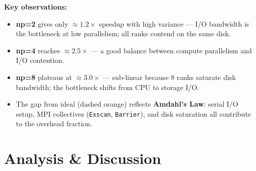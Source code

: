 \documentclass[11pt,a4paper]{article}
\begin{document}
\vspace{0.3cm}

\begin{tcolorbox}[colback=lightgray,colframe=primary,boxrule=0.8pt]
\small
\textbf{Key observations:}
\begin{itemize}[nosep,leftmargin=*]
  \item \textbf{np=2} gives only $\approx1.2\times$ speedup with high variance — I/O bandwidth is the bottleneck at low parallelism; all ranks contend on the same disk.
  \item \textbf{np=4} reaches $\approx2.5\times$ — a good balance between compute parallelism and I/O contention.
  \item \textbf{np=8} plateaus at $\approx3.0\times$ — sub-linear because 8 ranks saturate disk bandwidth; the bottleneck shifts from CPU to storage I/O.
  \item The gap from ideal (dashed orange) reflects \textbf{Amdahl's Law}: serial I/O setup, MPI collectives (\texttt{Exscan}, \texttt{Barrier}), and disk saturation all contribute to the overhead fraction.
\end{itemize}
\end{tcolorbox}

\newpage
\section{Analysis \& Discussion}
\end{document}
